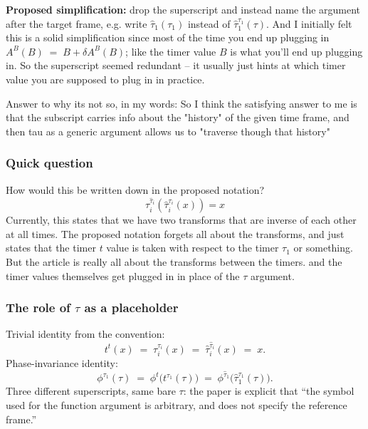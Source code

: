 \documentclass[11pt]{article}
\begin{document}
\textbf{Proposed simplification:} drop the superscript and instead name the argument after the target frame, e.g. write $\hat\tau_1(\tau_1)$ instead of $\hat\tau_1^{\tau_1}(\tau)$. And I initially felt this is a solid simplification since most of the time you end up plugging in $ A^B(B) \;=\; B + \delta A^B(B)$; like the timer value $B$ is what you'll end up plugging in. So the superscript seemed redundant -- it usually just hints at which timer value you are supposed to plug in in practice.

Answer to why its not so, in my words: So I think the satisfying answer to me is that the subscript carries info about the "history" of the given time frame, and then tau as a generic argument allows us to "traverse though that history"

\subsubsection{Quick question}
How would this be written down in the proposed notation?
\begin{equation*}
    \tau_i^{\hat\tau_i}(\hat\tau_i^{\tau_i}(x))=x
\end{equation*}
Currently, this states that we have two transforms that are inverse of each other at all times. The proposed notation forgets all about the transforms, and just states that the timer $t$ value is taken with respect to the timer $\tau_1$ or something. But the article is really all about the transforms between the timers. and the timer values themselves get plugged in in place of the $\tau$ argument.

\subsubsection{The role of $\tau$ as a placeholder}

Trivial identity from the convention:
\begin{equation*}
  t^t(x) \;=\; \tau_i^{\tau_i}(x) \;=\; \hat\tau_i^{\hat\tau_i}(x) \;=\; x .
\end{equation*}
Phase-invariance identity:
\begin{equation*}
  \phi^{\tau_1}(\tau) \;=\; \phi^{t}\!\big(t^{\tau_1}(\tau)\big)
  \;=\; \phi^{\hat\tau_1}\!\big(\hat\tau_1^{\tau_1}(\tau)\big).
\end{equation*}
Three different superscripts, same bare $\tau$: the paper is explicit that ``the symbol used for the function argument is arbitrary, and does not specify the reference frame.''
\end{document}

